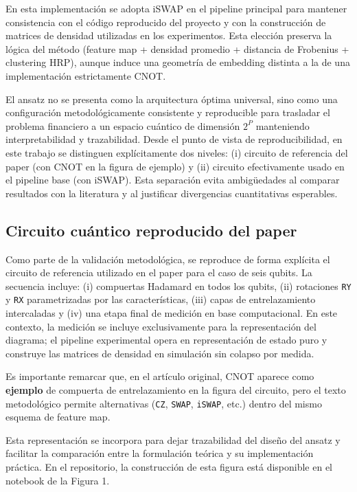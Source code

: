 En esta implementación se adopta iSWAP en el pipeline principal para mantener consistencia con el código reproducido del proyecto y con la construcción de matrices de densidad utilizadas en los experimentos. Esta elección preserva la lógica del método (feature map + densidad promedio + distancia de Frobenius + clustering HRP), aunque induce una geometría de embedding distinta a la de una implementación estrictamente CNOT.

El ansatz no se presenta como la arquitectura óptima universal, sino como una configuración metodológicamente consistente y reproducible para trasladar el problema financiero a un espacio cuántico de dimensión $2^P$ manteniendo interpretabilidad y trazabilidad. Desde el punto de vista de reproducibilidad, en este trabajo se distinguen explícitamente dos niveles: (i) circuito de referencia del paper (con CNOT en la figura de ejemplo) y (ii) circuito efectivamente usado en el pipeline base (con iSWAP). Esta separación evita ambigüedades al comparar resultados con la literatura y al justificar divergencias cuantitativas esperables.

\subsection{Circuito cuántico reproducido del paper}
\label{sec:circuito_reproducido_paper}

Como parte de la validación metodológica, se reproduce de forma explícita el circuito de referencia utilizado en el paper para el caso de seis qubits. La secuencia incluye: (i) compuertas Hadamard en todos los qubits, (ii) rotaciones \texttt{RY} y \texttt{RX} parametrizadas por las características, (iii) capas de entrelazamiento intercaladas y (iv) una etapa final de medición en base computacional. En este contexto, la medición se incluye exclusivamente para la representación del diagrama; el pipeline experimental opera en representación de estado puro y construye las matrices de densidad en simulación sin colapso por medida.

Es importante remarcar que, en el artículo original, CNOT aparece como \textbf{ejemplo} de compuerta de entrelazamiento en la figura del circuito, pero el texto metodológico permite alternativas (\texttt{CZ}, \texttt{SWAP}, \texttt{iSWAP}, etc.) dentro del mismo esquema de feature map.

Esta representación se incorpora para dejar trazabilidad del diseño del ansatz y facilitar la comparación entre la formulación teórica y su implementación práctica. En el repositorio, la construcción de esta figura está disponible en el notebook de la Figura 1.

